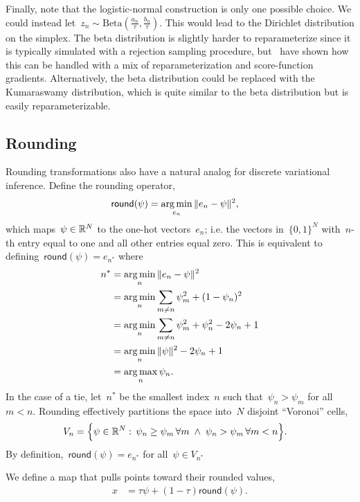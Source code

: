 Finally, note that the logistic-normal construction is only one
possible choice.  We could instead
let~${z_n \sim \mathrm{Beta}(\tfrac{a_n}{\tau},
  \tfrac{b_n}{\tau})}$. This would lead to the Dirichlet distribution
on the simplex.  The beta distribution is slightly harder to
reparameterize since it is typically simulated with a rejection
sampling procedure, but~\citet{naesseth2017reparameterization} have
shown how this can be handled with a mix of reparameterization and
score-function gradients.  Alternatively, the beta distribution could
be replaced with the Kumaraswamy distribution, which is quite similar
to the beta distribution but is easily reparameterizable.

\subsection{Rounding}
Rounding transformations also have a natural analog for discrete
variational inference.  Define the rounding operator,
\begin{align*}
  \mathsf{round}(\psi)
  &= \argmin_{e_n} \| e_n - \psi \|^2,
\end{align*}
which maps~${\psi \in \mathbb{R}^N}$ to the one-hot vectors~${e_n}$;
i.e. the vectors in~${\{0,1\}^N}$ with~$n$-th entry equal to one and
all other entries equal zero.  This is equivalent to
defining~${\mathsf{round}(\psi) = e_{n^*}}$ where
\begin{align*}
  n^* &= \argmin_{n} \|e_n - \psi \|^2 \\
  &= \argmin_{n} \sum_{m \neq n} \psi_m^2 + (1 - \psi_n)^2  \\
  &= \argmin_{n} \sum_{m \neq n} \psi_m^2 + \psi_n^2 - 2\psi_n + 1 \\
  &= \argmin_{n} \|\psi\|^2 - 2\psi_n + 1 \\
  &= \argmax_n \psi_n.
\end{align*}
In the case of a tie, let~$n^*$ be the smallest index~$n$ such
that~$\psi_n > \psi_m$ for all~$m < n$. Rounding effectively
partitions the space into~$N$ disjoint ``Voronoi'' cells,
\begin{align*}
  V_n &= \Big \{ \psi \in \mathbb{R}^N : \,
        \psi_n \geq \psi_m \, \forall m \; \wedge \;
        \psi_n > \psi_m \, \forall m < n
        \Big \}.
\end{align*}
By definition,~${\mathsf{round}(\psi) = e_{n^*}}$ for
all~${\psi \in V_{n^*}}$


We define a map that pulls points toward their rounded values,
\begin{align}
  \label{eq:round}
  x &=  \tau \psi + (1-\tau) \mathsf{round}(\psi).
\end{align}

